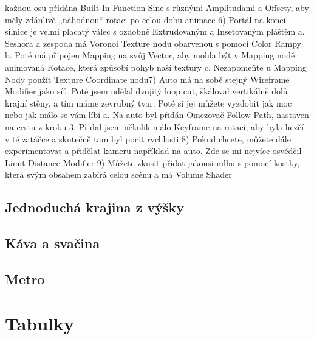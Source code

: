 \documentclass[12pt,a4paper]{report}
\begin{document}
\begin{enumerate}
		každou osu přidána Built-In Function Sine s různými
		Amplitudami a Offsety, aby měly zdánlivě „náhodnou“ rotaci
		po celou dobu animace
		6) Portál na konci silnice je velmi placatý válec s ozdobně
		Extrudovaným a Insetovaným pláštěm
		a. Seshora a zespoda má Voronoi Texture nodu obarvenou
		s pomocí Color Rampy
		b. Poté má připojen Mapping na svůj Vector, aby mohla být
		v Mapping nodě animovaná Rotace, která způsobí pohyb naší
		textury
		c. Nezapomeňte u Mapping Nody použít Texture Coordinate
		nodu7) Auto má na sobě stejný Wireframe Modifier jako síť. Poté jsem
		udělal dvojitý loop cut, škáloval vertikálně dolů krajní stěny, a tím
		máme zevrubný tvar. Poté si jej můžete vyzdobit jak moc nebo jak
		málo se vám líbí
		a. Na auto byl přidán Omezovač Follow Path, nastaven na cestu
		z kroku 3. Přidal jsem několik málo Keyframe na rotaci, aby
		byla hezčí v té zatáčce a skutečně tam byl pocit rychlosti
		8) Pokud chcete, můžete dále experimentovat a přidělat kameru
		například na auto. Zde se mi nejvíce osvědčil Limit Distance Modifier
		9) Můžete zkusit přidat jakousi mlhu s pomocí kostky, která svým
		obsahem zabírá celou scénu a má Volume Shader
		
	\end{enumerate}
	\section{Jednoduchá krajina z výšky}
	\section{Káva a svačina}
	\section{Metro}
	
	\chapter{Tabulky}
\end{document}
